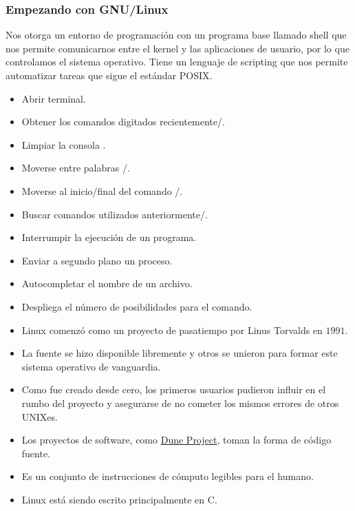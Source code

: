 \begin{frame}
	\frametitle{Empezando con GNU/Linux}
	Nos otorga un entorno de programación con un programa base llamado shell que nos permite comunicarnos entre el kernel y las aplicaciones de usuario, por lo que controlamos el sistema operativo.
	Tiene un lenguaje de scripting que nos permite automatizar tareas que sigue el estándar POSIX.

	\begin{itemize}
		\item Abrir terminal\quad{}.
		\item Obtener los comandos digitados recientemente\quad\keys{\arrowkeyup}/\keys{\arrowkeydown}.
		\item Limpiar la consola \quad{}.
		\item Moverse entre palabras \quad{}/.
		\item Moverse al inicio/final del comando \quad{}/.
		\item Buscar comandos utilizados anteriormente\quad{}/.
		\item Interrumpir la ejecución de un programa\quad{}.
		\item Enviar a segundo plano un proceso\quad{}.
		\item Autocompletar el nombre de un archivo\quad\keys{\tab}.
		\item Despliega el número de posibilidades para el comando\quad\keys{\tab+\tab}.
	\end{itemize}
\end{frame}


\begin{frame}
	\begin{itemize}
		\item
		      Linux comenzó como un proyecto de pasatiempo por Linus Torvalds en $1991$.
		\item
		      La fuente se hizo disponible libremente y otros se unieron para formar este sistema operativo de vanguardia.
		\item
		      Como fue creado desde cero, los primeros usuarios pudieron influir en el rumbo del proyecto y asegurarse de no cometer los mismos errores de otros UNIXes.
		\item
		      Los proyectos de software, como \href{https://dune-project.org}{Dune Project}, toman la forma de código fuente.
		\item
		Es un conjunto de instrucciones de cómputo legibles para el humano.
		\item Linux está siendo escrito principalmente en C.
	\end{itemize}
\end{frame}

